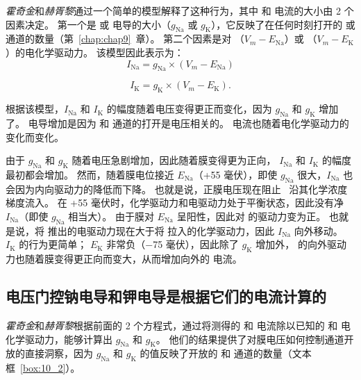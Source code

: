 \textit{霍奇金}和\textit{赫胥黎}通过一个简单的模型解释了这种行为，其中  和  电流的大小由 2 个因素决定。
第一个是  或  电导的大小（$g_\text{Na}$ 或 $g_\text{K}$），它反映了在任何时刻打开的  或  通道的数量（第~\ref{chap:chap9}~章）。
第二个因素是对  （$V_m − E_{\text{Na}}$）或 （$V_m − E_\text{K}$）的电化学驱动力。
该模型因此表示为：
\begin{equation}
	I_\text{Na} = g_\text{Na} \times (V_m - E_{\text{Na}})
\end{equation}

\begin{equation}
	I_\text{K} = g_\text{K} \times (V_m - E_\text{K}).
\end{equation}


根据该模型，$I_\text{Na}$ 和 $I_\text{K}$ 的幅度随着电压变得更正而变化，因为 $g_\text{Na}$ 和 $g_\text{K}$ 增加了。
电导增加是因为  和  通道的打开是电压相关的。
电流也随着电化学驱动力的变化而变化。


由于 $g_\text{Na}$ 和 $g_\text{K}$ 随着电压急剧增加，因此随着膜变得更为正向， $I_\text{Na}$ 和 $I_\text{K}$ 的幅度最初都会增加。
然而，随着膜电位接近 $E_{\text{Na}}$（+55 毫伏），即使 $g_\text{Na}$ 很大，$I_\text{Na}$ 也会因为内向驱动力的降低而下降。
也就是说，正膜电压现在阻止~ 沿其化学浓度梯度流入。
在 +55 毫伏时，化学驱动力和电驱动力处于平衡状态，因此没有净 $I_\text{Na}$（即使 $g_\text{Na}$ 相当大）。
由于膜对 $E_{\text{Na}}$ 呈阳性，因此对  的驱动力变为正。
也就是说，将  推出的电驱动力现在大于将  拉入的化学驱动力，因此 $I_\text{Na}$ 向外移动。
$I_\text{K}$ 的行为更简单；
$E_\text{K}$ 非常负（−75 毫伏），因此除了 $g_\text{K}$ 增加外， 的向外驱动力也随着膜变得更正向而变大，从而增加向外的  电流。



\subsection{电压门控钠电导和钾电导是根据它们的电流计算的}

\textit{霍奇金}和\textit{赫胥黎}根据前面的 2 个方程式，通过将测得的  和  电流除以已知的  和  电化学驱动力，能够计算出 $g_\text{Na}$ 和 $g_\text{K}$。
他们的结果提供了对膜电压如何控制通道开放的直接洞察，因为 $g_\text{Na}$ 和 $g_\text{K}$ 的值反映了开放的  和  通道的数量（文本框~\ref{box:10_2}）。



